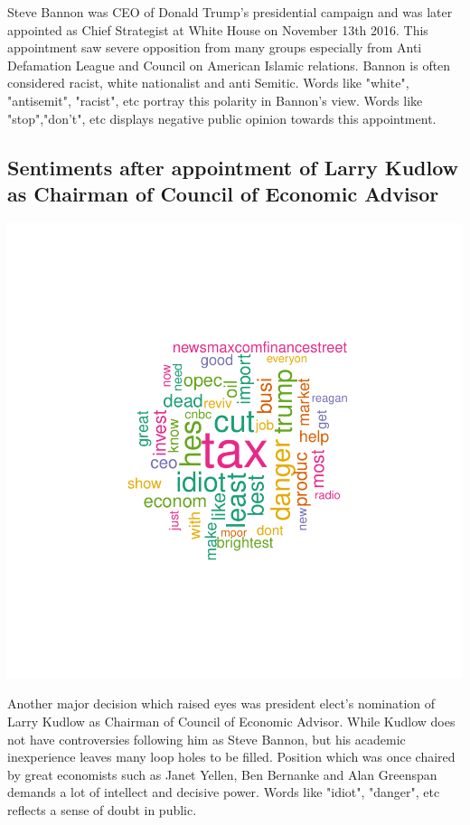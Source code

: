 \documentclass[a4paper,12pt]{book}
\theoremstyle{break}
\begin{document}
Steve Bannon was CEO of Donald Trump's presidential campaign and was later appointed as Chief Strategist at White House on November 13th 2016. This appointment saw severe opposition from many groups especially from Anti Defamation League and Council on American Islamic relations. Bannon is often considered racist, white nationalist and anti Semitic. Words like "white", "antisemit", "racist", etc portray this polarity in Bannon's view. Words like "stop","don't", etc displays negative public opinion towards this appointment.


\subsection{Sentiments after appointment of Larry Kudlow as Chairman of Council of Economic Advisor}

\includegraphics{finnn-r9}

Another major decision which raised eyes was president elect's nomination of Larry Kudlow as Chairman of Council of Economic Advisor. While Kudlow does not have controversies following him as Steve Bannon, but his academic inexperience leaves many loop holes to be filled. Position which was once chaired by great economists such as Janet Yellen, Ben Bernanke and Alan Greenspan demands a lot of intellect and decisive power. Words like "idiot", "danger", etc reflects a sense of doubt in public.
\end{document}
